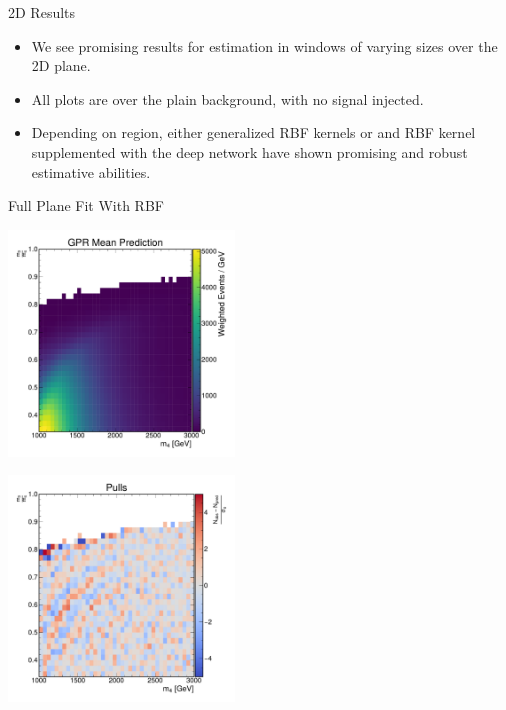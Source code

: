 \documentclass[10pt]{beamer}
\begin{document}
\begin{frame}{2D Results}
  \begin{itemize}
  \item We see promising results for estimation in windows of varying sizes over the 2D plane. 
  \item All plots are over the plain background, with no signal injected.
  \item Depending on region, either generalized RBF kernels or and RBF kernel supplemented with the deep network have shown promising and robust estimative abilities.
  \end{itemize}
\end{frame}

\begin{frame}{Full Plane Fit With RBF}
  \begin{center}
    \begin{annotimage}{\includegraphics[width=0.45\textwidth]{figures/rbf_gp_mean.pdf}}
    \end{annotimage}
    \begin{annotimage}{\includegraphics[width=0.45\textwidth]{figures/2dpullplots/rbf/NoWindow.pdf}}
    \end{annotimage}
  \end{center}
\end{frame}


\newcommand{\makegrid}[6]{
  \begin{center}
    \blockcite[(0,1em)]{#1}{$m_{\stopq}=1200\,,\,m_{\chi}=600$}
    \blockcite[(0,1em)]{#2}{$m_{\stopq}=1500\,,\,m_{\chi}=750$}
    \blockcite[(0,1em)]{#3}{$m_{\stopq}=1200\,,\,m_{\chi}=750$}
  \end{center}
  \begin{center}
    \blockcite[(0,1em)]{#4}{$m_{\stopq}=1500\,,\,m_{\chi}=1000$}
    \blockcite[(0,1em)]{#5}{$m_{\stopq}=2000\,,\,m_{\chi}=1000$}
    \blockcite[(0,1em)]{#6}{$m_{\stopq}=2000\,,\,m_{\chi}=1400$}
  \end{center}

}
\end{document}
